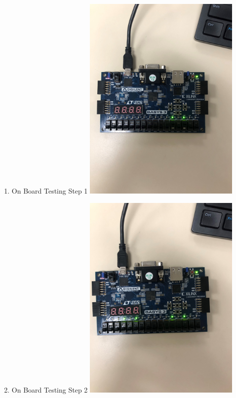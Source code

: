 \documentclass[11pt]{article}
\begin{document}
\begin{enumerate}
\item On Board Testing Step 1 
\includegraphics[width=0.6\textwidth, angle=270]{Lab9.1.jpg} \centering
\label{fig:On Board Testing Step 1 }

\item On Board Testing Step 2 
\includegraphics[width=0.6\textwidth, angle=270]{Lab9.2.jpg} \centering
\label{fig:On Board testing Step 2}


\end{enumerate}
\end{document}
